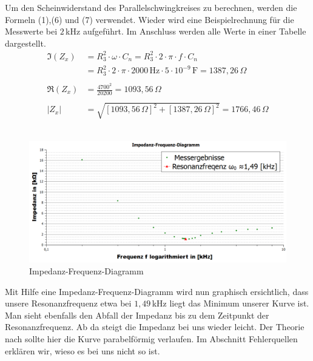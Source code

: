 \documentclass[fontsize=12pt]{scrartcl}
\begin{document}
Um den Scheinwiderstand des Parallelschwingkreises zu berechnen, werden die Formeln (1),(6) und (7) verwendet. Wieder wird eine Beispielrechnung für die Messwerte bei $2\,$kHz aufgeführt. Im Anschluss werden alle Werte in einer Tabelle dargestellt.
\begin{align*}
\Im(Z_x) &= R^2_3 \cdot \omega \cdot C_n = R^2_3 \cdot 2 \cdot \pi \cdot f \cdot C_n \\
&= R^2_3 \cdot 2 \cdot \pi \cdot 2000\,\text{Hz}\cdot 5\cdot 10^{-9}\,\text{F} = 1387,26\,\Omega \\
~\\
\Re(Z_x) &= \frac{4700^2}{20200} = 1093,56\,\Omega  \\
~\\
|Z_{x}|&= \sqrt{[1093,56\,\Omega]^2 +[1387,26\,\Omega]^2} = 1766,46\,\Omega
\end{align*}\\
\newpage
\begin{figure}[h]
\centering
\includegraphics[scale=0.5]{Graphik/Impedanz}
\caption{Impedanz-Frequenz-Diagramm}
\end{figure}
\noindent
Mit Hilfe eine Impedanz-Frequenz-Diagramm wird nun graphisch ersichtlich, dass unsere Resonanzfrequenz etwa bei $1,49\,$kHz liegt das Minimum unserer 
Kurve ist.
Man sieht ebenfalls den Abfall der Impedanz bis zu dem Zeitpunkt der Resonanzfrequenz. Ab da steigt die Impedanz bei uns wieder leicht. Der Theorie nach 
sollte hier die Kurve parabelförmig verlaufen. Im Abschnitt Fehlerquellen erklären wir, wieso es bei uns nicht so ist.
\newpage
\end{document}
